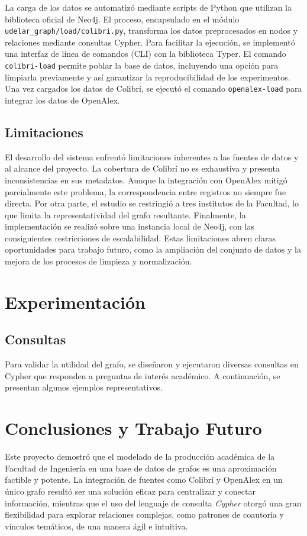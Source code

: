 \documentclass[journal]{IEEEtran}
\begin{document}
La carga de los datos se automatizó mediante scripts de Python que utilizan la biblioteca oficial de Neo4j. El proceso, encapsulado en el módulo \texttt{udelar\_graph/load/colibri.py}, transforma los datos preprocesados en nodos y relaciones mediante consultas Cypher. Para facilitar la ejecución, se implementó una interfaz de línea de comandos (CLI) con la biblioteca Typer. El comando \texttt{colibri-load} permite poblar la base de datos, incluyendo una opción para limpiarla previamente y así garantizar la reproducibilidad de los experimentos. Una vez cargados los datos de Colibrí, se ejecutó el comando \texttt{openalex-load} para integrar los datos de OpenAlex.

\subsection{Limitaciones}
El desarrollo del sistema enfrentó limitaciones inherentes a las fuentes de datos y al alcance del proyecto. La cobertura de Colibrí no es exhaustiva y presenta inconsistencias en sus metadatos. Aunque la integración con OpenAlex mitigó parcialmente este problema, la correspondencia entre registros no siempre fue directa. Por otra parte, el estudio se restringió a tres institutos de la Facultad, lo que limita la representatividad del grafo resultante. Finalmente, la implementación se realizó sobre una instancia local de Neo4j, con las consiguientes restricciones de escalabilidad. Estas limitaciones abren claras oportunidades para trabajo futuro, como la ampliación del conjunto de datos y la mejora de los procesos de limpieza y normalización.

\section{Experimentación}
\label{expe}

\subsection{Consultas}
Para validar la utilidad del grafo, se diseñaron y ejecutaron diversas consultas en Cypher que responden a preguntas de interés académico. A continuación, se presentan algunos ejemplos representativos.

\section{Conclusiones y Trabajo Futuro}
\label{conclusion}
Este proyecto demostró que el modelado de la producción académica de la Facultad de Ingeniería en una base de datos de grafos es una aproximación factible y potente. La integración de fuentes como Colibrí y OpenAlex en un único grafo resultó ser una solución eficaz para centralizar y conectar información, mientras que el uso del lenguaje de consulta \textit{Cypher} otorgó una gran flexibilidad para explorar relaciones complejas, como patrones de coautoría y vínculos temáticos, de una manera ágil e intuitiva.
\end{document}

